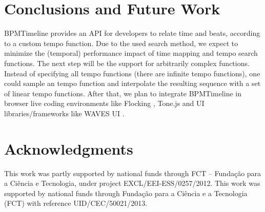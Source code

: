 \documentclass{sig-alternate}
\begin{document}
\section{Conclusions and Future Work}
\begin{sloppypar}
BPMTimeline provides an API for developers to relate time and beats, according to a custom tempo function. Due to the used search method, we expect to minimize the (temporal) performance impact of time mapping and tempo search functions.
The next step will be the support for arbitrarily complex functions. Instead of specifying all tempo functions (there are infinite tempo functions), one could sample an tempo function and interpolate the resulting sequence with a set of linear tempo functions. After that, we plan to integrate BPMTimeline in browser live coding environments like Flocking \cite{flocking:icmc2014}, Tone.js \cite{tonejs:wac2015} and UI libraries/frameworks like WAVES UI \cite{wavesui:wac2015}. 

\end{sloppypar}

\section{Acknowledgments}
This work was partly supported by national funds through FCT – Fundação  para a Ciência e Tecnologia, under project EXCL/EEI-ESS/0257/2012.
This work was supported by national funds through Fundação para a Ciência e a Tecnologia (FCT) with reference UID/CEC/50021/2013.

%

%
%
\balance
\end{document}
